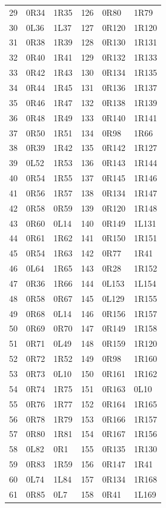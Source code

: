 \begin{longtable}{rll@{\qquad\qquad}rll}
29 & 0R34 & 1R35 & 126 & 0R80 & 1R79\\
30 & 0L36 & 1L37 & 127 & 0R120 & 1R120\\
31 & 0R38 & 1R39 & 128 & 0R130 & 1R131\\
32 & 0R40 & 1R41 & 129 & 0R132 & 1R133\\
33 & 0R42 & 1R43 & 130 & 0R134 & 1R135\\
34 & 0R44 & 1R45 & 131 & 0R136 & 1R137\\
35 & 0R46 & 1R47 & 132 & 0R138 & 1R139\\
36 & 0R48 & 1R49 & 133 & 0R140 & 1R141\\
37 & 0R50 & 1R51 & 134 & 0R98 & 1R66\\
38 & 0R39 & 1R42 & 135 & 0R142 & 1R127\\
39 & 0L52 & 1R53 & 136 & 0R143 & 1R144\\
40 & 0R54 & 1R55 & 137 & 0R145 & 1R146\\
41 & 0R56 & 1R57 & 138 & 0R134 & 1R147\\
42 & 0R58 & 0R59 & 139 & 0R120 & 1R148\\
43 & 0R60 & 0L14 & 140 & 0R149 & 1L131\\
44 & 0R61 & 1R62 & 141 & 0R150 & 1R151\\
45 & 0R54 & 1R63 & 142 & 0R77 & 1R41\\
46 & 0L64 & 1R65 & 143 & 0R28 & 1R152\\
47 & 0R36 & 1R66 & 144 & 0L153 & 1L154\\
48 & 0R58 & 0R67 & 145 & 0L129 & 1R155\\
49 & 0R68 & 0L14 & 146 & 0R156 & 1R157\\
50 & 0R69 & 0R70 & 147 & 0R149 & 1R158\\
51 & 0R71 & 0L49 & 148 & 0R159 & 1R120\\
52 & 0R72 & 1R52 & 149 & 0R98 & 1R160\\
53 & 0R73 & 0L10 & 150 & 0R161 & 1R162\\
54 & 0R74 & 1R75 & 151 & 0R163 & 0L10\\
55 & 0R76 & 1R77 & 152 & 0R164 & 1R165\\
56 & 0R78 & 1R79 & 153 & 0R166 & 1R157\\
57 & 0R80 & 1R81 & 154 & 0R167 & 1R156\\
58 & 0L82 & 0R1 & 155 & 0R135 & 1R130\\
59 & 0R83 & 1R59 & 156 & 0R147 & 1R41\\
60 & 0L74 & 1L84 & 157 & 0R134 & 1R168\\
61 & 0R85 & 0L7 & 158 & 0R41 & 1L169\\

\end{longtable}
